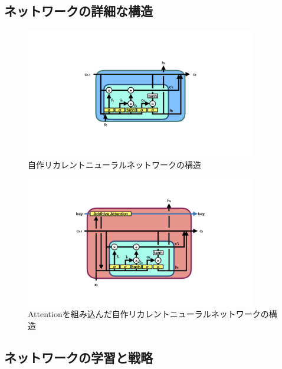 \subsection{ネットワークの詳細な構造} \label{Net:VLSTM:DetailedStructureofVLSTM}

\begin{figure}[h]
 \centering
 \includegraphics[width=0.9\textwidth]{Figure/3Networks/3-4-2-1VLSTMStructure.png}
 \caption{自作リカレントニューラルネットワークの構造}
 \label{3-4-2-1VLSTMStructure}
\end{figure}

\begin{figure}[h]
 \centering
 \includegraphics[width=0.9\textwidth]{Figure/3Networks/3-4-2-2AttentionVLSTM.png}
 \caption{Attentionを組み込んだ自作リカレントニューラルネットワークの構造}
 \label{3-4-2-2AttentionVLSTM}
\end{figure}


\subsection{ネットワークの学習と戦略} \label{Net:VLSTM:TrainingandStrategyofVLSTM}

